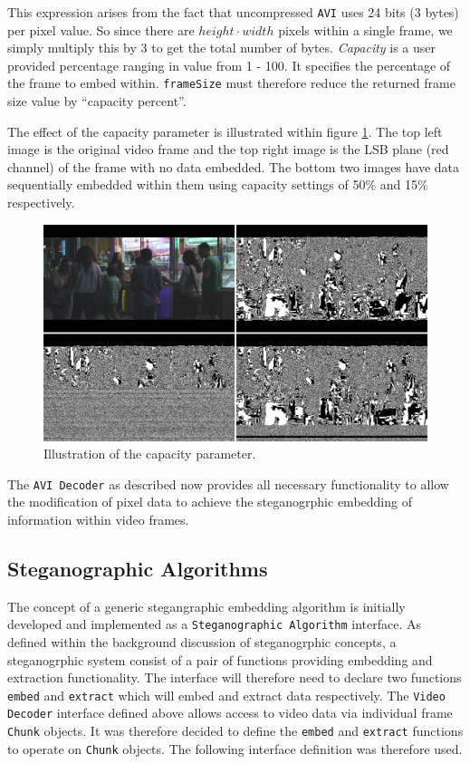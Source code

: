 \documentclass[paper=a4, fontsize=11pt,twoside]{scrartcl}    %
\numberwithin{table}{section}
\numberwithin{figure}{section}
\numberwithin{algorithm}{section}
\begin{document}
This expression arises from the fact that uncompressed \texttt{AVI} uses 24 bits (3 bytes) per pixel value. So since there are $height \cdot width$ pixels within a single frame, we simply multiply this by 3 to get the total number of bytes. \textit{Capacity} is a user provided percentage ranging in value from 1 - 100. It specifies the percentage of the frame to embed within. \texttt{frameSize} must therefore reduce the returned frame size value by ``capacity percent''.

The effect of the capacity parameter is illustrated within figure \ref{cap50}. The top left image is the original video frame and the top right image is the LSB plane (red channel) of the frame with no data embedded. The bottom two images have data sequentially embedded within them using capacity settings of 50\% and 15\% respectively.

\begin{figure}[here]
\centerline{\includegraphics[width=\textwidth]{images/cap_ill.png}}
\caption{Illustration of the capacity parameter.}
\label{cap50}
\end{figure}

\noindent
The \texttt{AVI Decoder} as described now provides all necessary functionality to allow the modification of pixel data to achieve the steganogrphic embedding of information within video frames. 


\subsection{Steganographic Algorithms}

The concept of a generic stegangraphic embedding algorithm is initially developed and implemented as a \texttt{Steganographic Algorithm} interface. As defined within the background discussion of steganogrphic concepts, a steganogrphic system consist of a pair of functions providing embedding and extraction functionality. The interface will therefore need to declare two functions \texttt{embed} and \texttt{extract} which will embed and extract data respectively. The \texttt{Video Decoder} interface defined above allows access to video data via individual frame \texttt{Chunk} objects. It was therefore decided to define the \texttt{embed} and \texttt{extract} functions to operate on \texttt{Chunk} objects. The following interface definition was therefore used.
\end{document}
